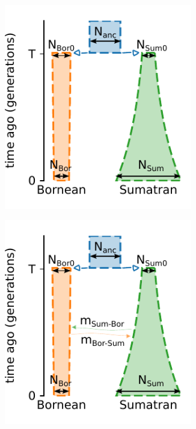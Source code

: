 \begin{figure}[ht!]
    \centering
    \begin{subfigure}[b]{0.33\linewidth}
        \centering
        \includegraphics[width=0.9\textwidth]{images_experiments/suimulation_2_stdpopsim/picture_ORAN_NOMIG.pdf}
        \caption{}
        \label{fig:experiments:sim_2:oran_nomig}
    \end{subfigure}%
    \begin{subfigure}[b]{0.3\linewidth}
        \centering
        \includegraphics[width=0.9\textwidth]{images_experiments/suimulation_2_stdpopsim/picture_ORAN_MIG.pdf}

\end{subfigure}
\end{figure}
